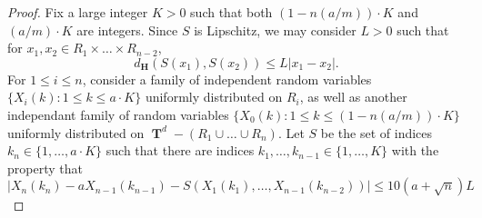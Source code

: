 \documentclass[dvipsnames,letterpaper,12pt]{article}
\numberwithin{equation}{section}
\DeclareMathOperator{\TT}{\mathbf{T}}
\newtheorem{lemma}[theorem]{Lemma}
\numberwithin{theorem}{section}
\begin{document}
\begin{proof}
    Fix a large integer $K > 0$ such that both $(1 - n (a/m)) \cdot K$ and $(a/m) \cdot K$ are integers. Since $S$ is Lipschitz, we may consider $L > 0$ such that for $x_1,x_2 \in R_1 \times \dots \times R_{n-2}$,
    \[ d_{\mathbf{H}}(S(x_1), S(x_2)) \leq L |x_1 - x_2|. \]
    For $1 \leq i \leq n$, consider a family of independent random variables $\{ X_i(k): 1 \leq k \leq a \cdot K \}$ uniformly distributed on $R_i$, as well as another independant family of random variables $\{ X_0(k) : 1 \leq k \leq (1 - n(a/m)) \cdot K \}$ uniformly distributed on $\TT^d - (R_1 \cup \dots \cup R_n)$. Let $S$ be the set of indices $k_n \in \{ 1, \dots, a \cdot K \}$ such that there are indices $k_1,\dots,k_{n-1} \in \{ 1, \dots, K \}$ with the property that
    \begin{equation}
        |X_n(k_n) - a X_{n-1}(k_{n-1}) - S(X_1(k_1), \dots, X_{n-1}(k_{n-2}))| \leq 10 (a + \sqrt{n}) L
    \end{equation}
\end{proof}

\begin{comment}

\begin{lemma} \label{equationDIOJDOIJCIJ}
    Let $S$ be the set of indices $k_1 \in \{ 1, \dots, K \}$ such that there are indices $k_2,\dots,k_n \in \{ 1,\dots,K \}$ with the property that
    \[ |X_1(k_1) - f(X_2(k_2),\dots,X_n(k_n))| \leq (L+1)r. \]
    Then if $k_1 \not \in S$ and $k_2,\dots,k_n \in \{ 1,\dots,K \}$, if $X = (X_{k_1}^1,\dots,X_{k_n}^n)$, then $d(X,W) \geq r$.
\end{lemma}
\begin{proof}
    It follows by definition that
    \[ |X_1(k_1) - f(X_2(k_2),\dots,X_n(k_n))| \geq (L+1)r. \]
    If $Y = (Y_1,\dots,Y_n) \in W \cap (Q_1 \times \dots \times Q_n)$, then
    \begin{align*}
        (L+1)r &\leq |X_1(k_1) - f(X_2(k_2),\dots,X_n(k_n))|\\
        &\leq |X_1(k_1) - Y_1| + |Y_1 - f(X_2(k_2),\dots,X_n(k_n)|\\
        &= |X_1(k_1) - Y_1| + |f(Y_2,\dots,Y_n) - f(X_2(k_2),\dots,X_n(k_n)|\\
        &\leq |X_1(k_1) - Y_1| + L|(Y_2,\dots,Y_n) - (X_2(k_2),\dots,X_n(k_n))\\
        &\leq (L+1) |X - Y|,
    \end{align*}
    so $|X-Y| \geq r$.
\end{proof}

\end{comment}
\end{document}
